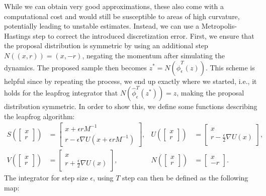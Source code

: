 While we can obtain very good approximations, these also come with a computational cost and would still be susceptible to areas of high curvature, potentially leading to unstable estimates. 
Instead, we can use a Metropolis-Hastings step to correct the introduced discretization error.
First, we ensure that the proposal distribution is symmetric by using an additional step $N((x, r)) = (x, -r)$, negating the momentum after simulating the dynamics.
The proposed sample then becomes $z^\ast = N(\hat{\phi}_\epsilon^T(z)) $.
This scheme is helpful since by repeating the process, we end up exactly where we started, i.e., it holds for the leapfrog integrator that $N(\hat{\phi}_\epsilon^T(z^\ast)) = z$, making the proposal distribution symmetric.
In order to show this, we define some functions describing the leapfrog algorithm:
\begin{align} 
    S \left(\begin{bmatrix} x \\ r \end{bmatrix}\right) 
    &= \begin{bmatrix} x + \epsilon r M^{-1} \\ r - \epsilon \nabla U(x + \epsilon r M^{-1}) \end{bmatrix}, &
    U\left(\begin{bmatrix} x \\ r \end{bmatrix}\right) 
    &= \begin{bmatrix} x \\ r - \frac{\epsilon}{2} \nabla U(x) \end{bmatrix}, \label{eq:leapfrog-defs:1} \\
    V\left(\begin{bmatrix} x \\ r \end{bmatrix}\right)
    &= \begin{bmatrix} x \\ r + \frac{\epsilon}{2} \nabla U(x) \end{bmatrix}, &
    N \left(\begin{bmatrix} x \\ r \end{bmatrix}\right) 
    &= \begin{bmatrix} x \\ -r \label{eq:leapfrog-defs:2}
    \end{bmatrix}. 
\end{align}
The integrator for step size $\epsilon$, using $T$ step can then be defined as the following map:

